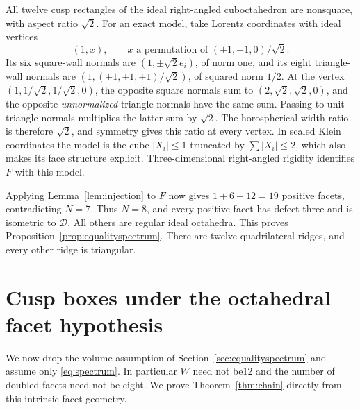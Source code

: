 \documentclass[11pt]{article}
\theoremstyle{remark}
\newcommand{\DBL}{\mathcal D}
\begin{document}
All twelve cusp rectangles of the ideal right-angled cuboctahedron
are nonsquare, with aspect ratio $\sqrt2$. For an exact model, take
Lorentz coordinates with ideal vertices
\[
 (1,x),\qquad
 x\text{ a permutation of }(\pm1,\pm1,0)/\sqrt2.
\]
Its six square-wall normals are $(1,\pm\sqrt2 e_i)$, of norm one,
and its eight triangle-wall normals are
$(1,(\pm1,\pm1,\pm1)/\sqrt2)$, of squared norm $1/2$.
At the vertex $(1,1/\sqrt2,1/\sqrt2,0)$, the opposite square
normals sum to $(2,\sqrt2,\sqrt2,0)$, and the opposite
\emph{unnormalized} triangle normals have the same sum. Passing to
unit triangle normals multiplies the latter sum by $\sqrt2$.
The horospherical width ratio is therefore $\sqrt2$, and symmetry
gives this ratio at every vertex. In scaled Klein coordinates the
model is the cube $|X_i|\le1$ truncated by
$\sum|X_i|\le2$, which also makes its face structure explicit.
Three-dimensional right-angled rigidity identifies $F$ with this
model.

Applying Lemma~\ref{lem:injection} to $F$ now gives
$1+6+12=19$ positive facets, contradicting $N=7$. Thus $N=8$,
and every positive facet has defect three and is isometric to
$\DBL$. All others are regular ideal octahedra. This proves
Proposition~\ref{prop:equalityspectrum}. There are twelve
quadrilateral ridges, and every other ridge is triangular.

\section{Cusp boxes under the octahedral facet hypothesis}\label{sec:chainproof}
We now drop the volume assumption of Section~\ref{sec:equalityspectrum}
and assume only \eqref{eq:spectrum}. In particular $W$ need not be12
and the number of doubled facets need not be eight. We prove
Theorem~\ref{thm:chain} directly from this intrinsic facet geometry.
\end{document}

